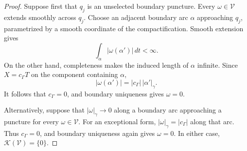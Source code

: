 \documentclass[11pt]{amsart}
\numberwithin{equation}{section}
\theoremstyle{definition}
\theoremstyle{remark}
\newcommand{\KK}{\mathcal K}
\begin{document}
\begin{proof}
Suppose first that $q_j$ is an unselected boundary puncture.
Every $\omega\in\mathcal V$ extends smoothly across $q_j$.
Choose an adjacent boundary arc $\alpha$ approaching $q_j$,
parametrized by a smooth coordinate of the compactification.
Smooth extension gives
\[
\int_\alpha|\omega(\alpha')|\,dt<\infty.
\]
On the other hand, completeness makes the induced length of
$\alpha$ infinite. Since $X=c_\Gamma T$ on the component
containing $\alpha$,
\[
|\omega(\alpha')|=|c_\Gamma|\,|\alpha'|_\gamma.
\]
It follows that $c_\Gamma=0$, and boundary uniqueness gives
$\omega=0$.

Alternatively, suppose that $|\omega|_\gamma\to0$ along a
boundary arc approaching a puncture for every
$\omega\in\mathcal V$. For an exceptional form,
$|\omega|_\gamma=|c_\Gamma|$ along that arc. Thus
$c_\Gamma=0$, and boundary uniqueness again gives $\omega=0$.
In either case, $\KK(\mathcal V)=\{0\}$.
\end{proof}
\end{document}
